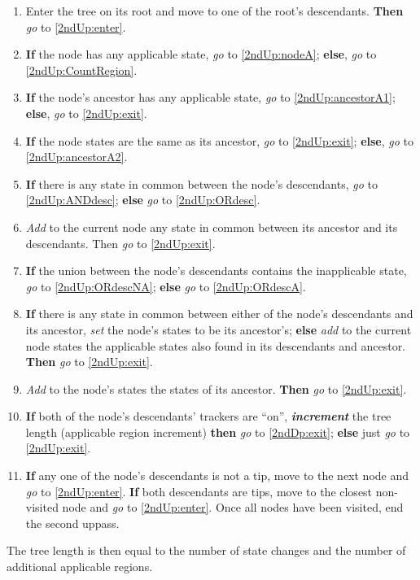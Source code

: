 \documentclass[a4paper,12pt]{article}
\begin{document}
\begin{enumerate}
    \item Enter the tree on its root and move to one of the root's descendants. \textbf{Then} \textit{go} to \ref{2ndUp:enter}.
    \item \label{2ndUp:enter} \textbf{If} the node has any applicable state, \textit{go} to \ref{2ndUp:nodeA}; \textbf{else}, \textit{go} to \ref{2ndUp:CountRegion}.
    \item \label{2ndUp:nodeA} \textbf{If} the node's ancestor has any applicable state, \textit{go} to \ref{2ndUp:ancestorA1}; \textbf{else}, \textit{go} to \ref{2ndUp:exit}.
    \item \label{2ndUp:ancestorA1} \textbf{If} the node states are the same as its ancestor, \textit{go} to \ref{2ndUp:exit}; \textbf{else}, \textit{go} to \ref{2ndUp:ancestorA2}.
    \item \label{2ndUp:ancestorA2} \textbf{If} there is any state in common between the node's descendants, \textit{go} to \ref{2ndUp:ANDdesc}; \textbf{else} \textit{go} to \ref{2ndUp:ORdesc}.
    \item \label{2ndUp:ANDdesc} \textit{Add} to the current node any state in common between its ancestor and its descendants. Then \textit{go} to \ref{2ndUp:exit}.
    \item \label{2ndUp:ORdesc} \textbf{If} the union between the node's descendants contains the inapplicable state, \textit{go} to \ref{2ndUp:ORdescNA}; \textbf{else} \textit{go} to \ref{2ndUp:ORdescA}.
    \item \label{2ndUp:ORdescNA} \textbf{If} there is any state in common between either of the node's descendants and its ancestor, \textit{set} the node's states to be its ancestor's; \textbf{else} \textit{add} to the current node states the applicable states also found in its descendants and ancestor. \textbf{Then} \textit{go} to \ref{2ndUp:exit}.
    \item \label{2ndUp:ORdescA} \textit{Add} to the node's states the states of its ancestor. \textbf{Then} \textit{go} to \ref{2ndUp:exit}.
    \item \label{2ndUp:CountRegion} \textbf{If} both of the node's descendants' trackers are ``on'', \textbf{\textit{increment}} the tree length (applicable region increment) \textbf{then} \textit{go} to \ref{2ndDp:exit}; \textbf{else} just \textit{go} to \ref{2ndUp:exit}.
    \item \label{2ndUp:exit} \textbf{If} any one of the node's descendants is not a tip, move to the next node and \textit{go} to \ref{2ndUp:enter}. \textbf{If} both descendants are tips, move to the closest non-visited node and \textit{go} to \ref{2ndUp:enter}. Once all nodes have been visited, end the second uppass.
\end{enumerate}

The tree length is then equal to the number of state changes and the number of additional applicable regions.
\end{document}
